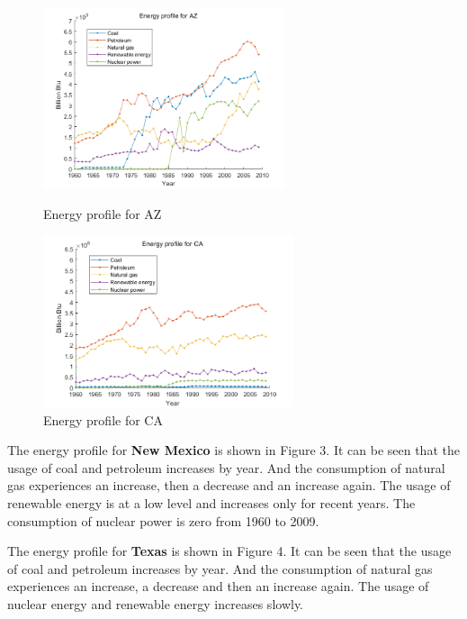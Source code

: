 \documentclass{mcmthesis}
\begin{document}
 \begin{figure}
\begin{minipage}[t]{0.5\linewidth}
\centering
\includegraphics[width=2.8in]{./picture/AZ.png}
\caption{Energy profile for AZ}
\label{fig:left:1}
\end{minipage}%
\begin{minipage}[t]{0.5\linewidth}
\centering
\includegraphics[width=2.9in]{./picture/CA.png}
\caption{Energy profile for CA}
\label{fig:right:1}
\end{minipage}
\end{figure}      
 
The energy profile for {\bf{New Mexico}} is shown in Figure 3. It can be seen that the usage of coal and petroleum increases by year. And the consumption of natural gas experiences an increase, then a decrease and an increase again. The usage of renewable energy is at a low level and increases only for recent years. The consumption of nuclear power is zero from 1960 to 2009.

The energy profile for {\bf{Texas}} is shown in Figure 4. It can be seen that the usage of coal and petroleum increases by year. And the consumption of natural gas experiences an increase, a decrease and then an increase again. The usage of nuclear energy and renewable energy increases slowly.
\end{document}
